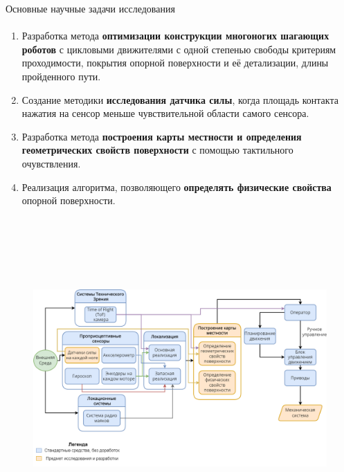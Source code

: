 \documentclass[aspectratio=169,xcolor=table]{beamer}
\newcommand{\fbckg}[1]{\usebackgroundtemplate{\texttt{[image: \#1]}}}%
\begin{document}
\begin{frame}[t]{Основные научные задачи исследования}
\framesubtitle{}
\begin{enumerate}
    \item Разработка метода \textbf{оптимизации конструкции многоногих шагающих роботов} с цикловыми движителями с одной степенью свободы критериям проходимости, покрытия опорной поверхности и её детализации, длины пройденного пути.
    \item Создание методики \textbf{исследования датчика силы}, когда площадь контакта нажатия на сенсор меньше чувствительной области самого сенсора.
  \item  Разработка метода \textbf{построения карты местности и определения геометрических свойств поверхности} с помощью тактильного очувствления.
  \item Реализация алгоритма, позволяющего \textbf{определять физические свойства} опорной поверхности.
\end{enumerate}
\end{frame}


\usebackgroundtemplate{}
\begin{frame}[t]{}
    \framesubtitle{}
        \vspace{-0.4cm}
        \begin{figure}[H]
            \centering\includegraphics[height=12cm,width=1\textwidth,keepaspectratio]{main_diag_hor.png}
            \label{fig:main_diag_hor.png}
        \end{figure}
    \end{frame}
\fbckg{fibeamer/figs/common.png}
\end{document}
